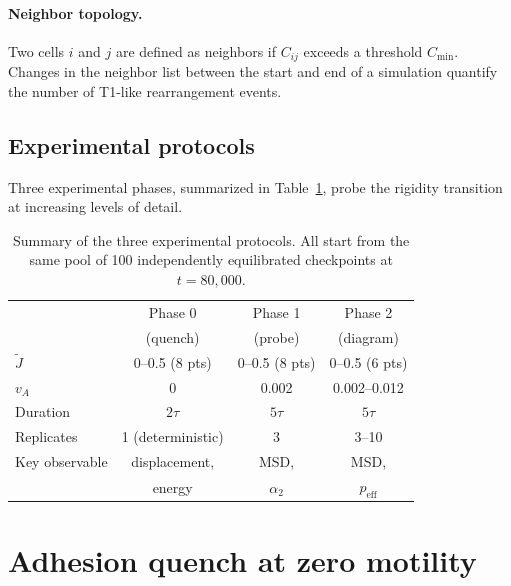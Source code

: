 \documentclass[aps,pre,twocolumn,superscriptaddress,longbibliography]{revtex4-2}
\newcommand{\vA}{v_{\!A}}                  %
\newcommand{\peff}{p_{\mathrm{eff}}}       %
\newcommand{\Jk}{\tilde{J}}                %
\begin{document}
\paragraph{Neighbor topology.}
Two cells $i$ and $j$ are defined as neighbors if $C_{ij}$ exceeds a threshold
$C_{\min}$.  Changes in the neighbor list between the start and end of a
simulation quantify the number of T1-like rearrangement events.

\subsection{Experimental protocols}
\label{sec:methods:protocols}

Three experimental phases, summarized in Table~\ref{tab:protocols}, probe the
rigidity transition at increasing levels of detail.

\begin{table}[t]
  \caption{%
    Summary of the three experimental protocols.  All start from the same
    pool of 100 independently equilibrated checkpoints at $t = 80{,}000$.
  }
  \label{tab:protocols}
  \begin{ruledtabular}
  \begin{tabular}{lccc}
    & Phase 0     & Phase 1       & Phase 2           \\
    & (quench)    & (probe)       & (diagram)         \\ \hline
    $\Jk$
      & 0--0.5 (8 pts)  & 0--0.5 (8 pts) & 0--0.5 (6 pts) \\
    $\vA$
      & 0               & 0.002          & 0.002--0.012    \\
    Duration
      & $2\tau$          & $5\tau$        & $5\tau$         \\
    Replicates
      & 1 (deterministic)& 3             & 3--10           \\
    Key observable
      & displacement,    & MSD,           & MSD,            \\
      & energy           & $\alpha_2$     & $\peff$         \\
  \end{tabular}
  \end{ruledtabular}
\end{table}


\section{Adhesion quench at zero motility}
\label{sec:quench}
\end{document}
